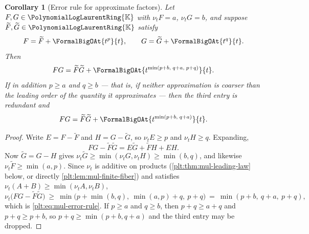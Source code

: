 \documentclass[11pt,oneside]{article}
\theoremstyle{plain}
\newtheorem{corollary}[theorem]{Corollary}
\theoremstyle{definition}
\theoremstyle{remark}
\newcommand{\K}{\mathbb{K}}
\newcommand{\PLlau}{\PolynomialLogLaurentRing{\K}}       %
\newcommand{\ordt}{\nu_{t}}                              %
\begin{document}
\begin{corollary}[Error rule for approximate factors]
\label{plt:cor:mul-error-rule}
Let $F,G\in\PLlau$ with $\ordt F=a$, $\ordt G=b$, and suppose
$\widetilde F,\widetilde G\in\PLlau$ satisfy
\[
 F=\widetilde F+\FormalBigOAt{t^{p}}{t},
 \qquad
 G=\widetilde G+\FormalBigOAt{t^{q}}{t}.
\]
Then
\begin{equation}\label{plt:eq:mul-error-rule}
 FG=\widetilde F\widetilde G
 +\FormalBigOAt{t^{\min(p+b,\;q+a,\;p+q)}}{t}.
\end{equation}
If in addition $p\ge a$ and $q\ge b$ --- that is, if neither approximation is
coarser than the leading order of the quantity it approximates --- then the
third entry is redundant and
\begin{equation}\label{plt:eq:mul-error-rule-normalized}
 FG=\widetilde F\widetilde G
 +\FormalBigOAt{t^{\min(p+b,\;q+a)}}{t}.
\end{equation}
\end{corollary}

\begin{proof}
Write $E=F-\widetilde F$ and $H=G-\widetilde G$, so $\ordt E\ge p$ and
$\ordt H\ge q$.  Expanding,
\begin{equation}\label{plt:eq:mul-error-expansion}
 FG-\widetilde F\widetilde G
 =E\widetilde G+\widetilde FH+EH .
\end{equation}
Now $\widetilde G=G-H$ gives
$\ordt\widetilde G\ge\min(\ordt G,\ordt H)\ge\min(b,q)$, and likewise
$\ordt\widetilde F\ge\min(a,p)$.  Since $\ordt$ is additive on products
(\cref{plt:thm:mul-leading-law} below, or directly
\cref{plt:lem:mul-finite-fiber}) and satisfies
$\ordt(A+B)\ge\min(\ordt A,\ordt B)$,
\[
 \ordt\bigl(FG-\widetilde F\widetilde G\bigr)
 \ \ge\
 \min\bigl(p+\min(b,q),\ \min(a,p)+q,\ p+q\bigr)
 \ =\ \min(p+b,\ q+a,\ p+q),
\]
which is \eqref{plt:eq:mul-error-rule}.  If $p\ge a$ and $q\ge b$, then
$p+q\ge a+q$ and $p+q\ge p+b$, so $p+q\ge\min(p+b,q+a)$ and the third entry
may be dropped.
\end{proof}
\end{document}
